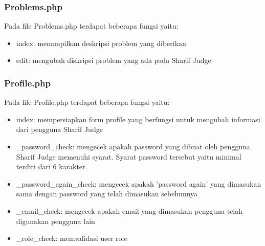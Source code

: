 \subsubsection{Problems.php}
Pada file Problems.php terdapat beberapa fungsi yaitu:
\begin{itemize}
	\item index: menampilkan deskripsi problem yang diberikan
	\item edit: mengubah diskripsi problem yang ada pada Sharif Judge
\end{itemize}

\subsubsection{Profile.php}
Pada file Profile.php terdapat beberapa fungsi yaitu:
\begin{itemize}
	\item index: mempersiapkan form profile yang berfungsi untuk mengubah informasi dari pengguna Sharif Judge
	\item \_password\_check: mengecek apakah password yang dibuat oleh pengguna Sharif Judge memenuhi syarat. Syarat password tersebut yaitu minimal terdiri dari 6 karakter.
	\item \_password\_again\_check: mengecek apakah 'password again' yang dimasukan sama dengan password yang telah dimasukan sebelumnya
	\item \_email\_check: mengecek apakah email yang dimasukan pengguna telah digunakan pengguna lain
	\item \_role\_check: memvalidasi user role
\end{itemize}